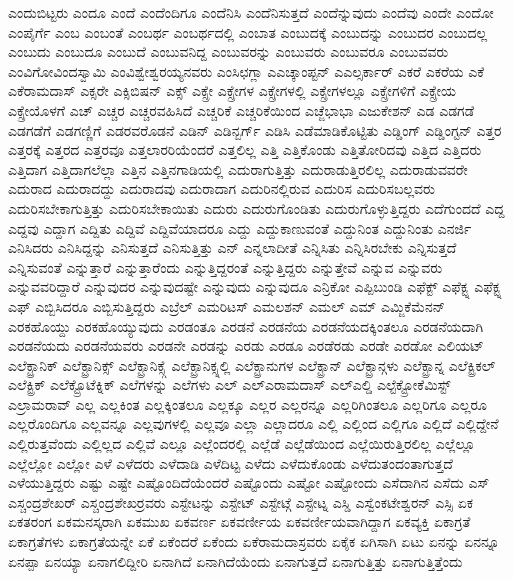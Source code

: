 {ಎಂದುಬಿಟ್ಟರು
ಎಂದೂ
ಎಂದೆ
ಎಂದೆಂದಿಗೂ
ಎಂದೆನಿಸಿ
ಎಂದೆನಿಸುತ್ತದೆ
ಎಂದೆನ್ನುವುದು
ಎಂದೆವು
ಎಂದೇ
ಎಂದೋ
ಎಂಪೈರ್ಗೆ
ಎಂಬ
ಎಂಬಂತೆ
ಎಂಬರ್ಥ
ಎಂಬರ್ಥದಲ್ಲಿ
ಎಂಬಾತ
ಎಂಬುದಕ್ಕೆ
ಎಂಬುದನ್ನು
ಎಂಬುದರ
ಎಂಬುದಲ್ಲ
ಎಂಬುದು
ಎಂಬುದೂ
ಎಂಬುದೆ
ಎಂಬುವನಿದ್ದ
ಎಂಬುವರನ್ನು
ಎಂಬುವರು
ಎಂಬುವರೂ
ಎಂಬುವವರು
ಎಂವಿಗೋವಿಂದಸ್ವಾಮಿ
ಎಂವಿಶ್ವೇಶ್ವರಯ್ಯನವರು
ಎಂಸಿಛಗ್ಲಾ
ಎಎಚ್ಕಾಂಪ್ಟನ್
ಎಎಲ್ಸರ್ಕಾರ್
ಎಕರೆ
ಎಕರೆಯ
ಎಕೆ
ಎಕೆರಾಮದಾಸ್
ಎಕ್ಸರೇ
ಎಕ್ಸಿಬಿಷನ್
ಎಕ್ಸ್
ಎಕ್ಸ್ರೇ
ಎಕ್ಸ್ರೇಗಳ
ಎಕ್ಸ್ರೇಗಳಲ್ಲಿ
ಎಕ್ಸ್ರೇಗಳಲ್ಲೂ
ಎಕ್ಸ್ರೇಗಳಿಗೆ
ಎಕ್ಸ್ರೇಯ
ಎಕ್ಸ್ರೇಯೊಳಗೆ
ಎಚ್
ಎಚ್ಚರ
ಎಚ್ಚರವಹಿಸಿದೆ
ಎಚ್ಚರಿಕೆ
ಎಚ್ಚರಿಕೆಯಿಂದ
ಎಚ್ಜೆಭಾಭಾ
ಎಜುಕೇಶನ್
ಎಡ
ಎಡಗಡೆ
ಎಡಗಡೆಗೆ
ಎಡಗಣ್ಣಿಗೆ
ಎಡರವರೊಡನೆ
ಎಡಿನ್
ಎಡಿನ್ಬರ್ಗ್
ಎಡಿಸಿ
ಎಡೆಮಾಡಿಕೊಟ್ಟಿತು
ಎಡ್ಡಿಂಗ್
ಎಡ್ಡಿಂಗ್ಟನ್
ಎತ್ತರ
ಎತ್ತರಕ್ಕೆ
ಎತ್ತರದ
ಎತ್ತರವೂ
ಎತ್ತಲಾರರಿಯೆಂದರೆ
ಎತ್ತಲಿಲ್ಲ
ಎತ್ತಿ
ಎತ್ತಿಕೊಂಡು
ಎತ್ತಿತೋರಿದವು
ಎತ್ತಿದ
ಎತ್ತಿದರು
ಎತ್ತಿದಾಗ
ಎತ್ತಿದಾಗಲೆಲ್ಲಾ
ಎತ್ತಿನ
ಎತ್ತಿನಗಾಡಿಯಲ್ಲಿ
ಎದುರಾಗುತ್ತಿತ್ತು
ಎದುರಾಡುತ್ತಿರಲಿಲ್ಲ
ಎದುರಾಡುವವರೇ
ಎದುರಾದ
ಎದುರಾದದ್ದು
ಎದುರಾದವು
ಎದುರಾದಾಗ
ಎದುರಿನಲ್ಲಿರುವ
ಎದುರಿಸ
ಎದುರಿಸಬಲ್ಲವರು
ಎದುರಿಸಬೇಕಾಗುತ್ತಿತ್ತು
ಎದುರಿಸಬೇಕಾಯಿತು
ಎದುರು
ಎದುರುಗೊಂಡಿತು
ಎದುರುಗೊಳ್ಳುತ್ತಿದ್ದರು
ಎದೆಗುಂದದೆ
ಎದ್ದ
ಎದ್ದವು
ಎದ್ದಾಗ
ಎದ್ದಿತು
ಎದ್ದಿವೆ
ಎದ್ದಿವೆಯಾದರೂ
ಎದ್ದು
ಎದ್ದುಕಾಣುವಂತೆ
ಎದ್ದುನಿಂತ
ಎದ್ದುನಿಂತು
ಎನರ್ಜಿ
ಎನಿಸಿದರು
ಎನಿಸಿದ್ದನ್ನು
ಎನಿಸುತ್ತದೆ
ಎನಿಸುತ್ತಿತ್ತು
ಎನ್
ಎನ್ನಲಾದೀತೆ
ಎನ್ನಿಸಿತು
ಎನ್ನಿಸಿರಬೇಕು
ಎನ್ನಿಸುತ್ತದೆ
ಎನ್ನಿಸುವಂತೆ
ಎನ್ನುತ್ತಾರೆ
ಎನ್ನುತ್ತಾರೆಂದು
ಎನ್ನುತ್ತಿದ್ದರಂತೆ
ಎನ್ನುತ್ತಿದ್ದರು
ಎನ್ನುತ್ತೇವೆ
ಎನ್ನುವ
ಎನ್ನುವರು
ಎನ್ನುವವರಿದ್ದಾರೆ
ಎನ್ನುವುದರ
ಎನ್ನುವುದಷ್ಟೇ
ಎನ್ನುವುದು
ಎನ್ನುವುದೂ
ಎನ್ರಿಕೋ
ಎಪ್ಪಿಬುಂಡಿ
ಎಫೆಕ್ಟ್
ಎಫೆಕ್ಟ್ನ
ಎಫೆಕ್ಟ್ನ
ಎಫ್
ಎಬ್ಬಿಸಿದರೂ
ಎಬ್ಬಿಸುತ್ತಿದ್ದರು
ಎಬ್ರೆಲ್
ಎಮರಿಟಸ್
ಎಮಲಶನ್
ಎಮಲ್
ಎಮ್
ಎಮ್ಜಿಕೆಮೆನನ್
ಎರಕಹೊಯ್ದು
ಎರಕಹೊಯ್ಯುವುದು
ಎರಡಂತೂ
ಎರಡನೆ
ಎರಡನೆಯ
ಎರಡನೆಯದಕ್ಕಿಂತಲೂ
ಎರಡನೆಯದಾಗಿ
ಎರಡನೆಯದು
ಎರಡನೆಯವರು
ಎರಡನೇ
ಎರಡನ್ನು
ಎರಡು
ಎರಡೂ
ಎರಡೆರಡು
ಎರಡೇ
ಎರಡೋ
ಎಲಿಯಟ್
ಎಲೆಕ್ಟ್ರಾನಿಕ್
ಎಲೆಕ್ಟ್ರಾನಿಕ್ಸ್
ಎಲೆಕ್ಟ್ರಾನಿಕ್ಸ್ಗೆ
ಎಲೆಕ್ಟ್ರಾನಿಕ್ಸ್ನಲ್ಲಿ
ಎಲೆಕ್ಟ್ರಾನುಗಳ
ಎಲೆಕ್ಟ್ರಾನ್
ಎಲೆಕ್ಟ್ರಾನ್ಗಳು
ಎಲೆಕ್ಟ್ರಾನ್ನ
ಎಲೆಕ್ಟ್ರಿಕಲ್
ಎಲೆಕ್ಟ್ರಿಕ್
ಎಲೆಕ್ಟ್ರೊಟೆಕ್ನಿಕ್
ಎಲೆಗಳನ್ನು
ಎಲೆಗಳು
ಎಲ್
ಎಲ್ಎರಾಮದಾಸ್
ಎಲ್ಎಲ್ಡಿ
ಎಲ್ಟೆಕ್ಟ್ರೋಕೆಮಿಸ್ಟ್
ಎಲ್ರಾಮರಾವ್
ಎಲ್ಲ
ಎಲ್ಲಕಿಂತ
ಎಲ್ಲಕ್ಕಿಂತಲೂ
ಎಲ್ಲಕ್ಕೂ
ಎಲ್ಲರ
ಎಲ್ಲರನ್ನೂ
ಎಲ್ಲರಿಗಿಂತಲೂ
ಎಲ್ಲರಿಗೂ
ಎಲ್ಲರೂ
ಎಲ್ಲರೊಂದಿಗೂ
ಎಲ್ಲವನ್ನೂ
ಎಲ್ಲವುಗಳಲ್ಲಿ
ಎಲ್ಲವೂ
ಎಲ್ಲಾ
ಎಲ್ಲಾದರೂ
ಎಲ್ಲಿ
ಎಲ್ಲಿಂದ
ಎಲ್ಲಿಗೂ
ಎಲ್ಲಿದೆ
ಎಲ್ಲಿದ್ದೇನೆ
ಎಲ್ಲಿರುತ್ತವೆಂದು
ಎಲ್ಲಿಲ್ಲದ
ಎಲ್ಲಿವೆ
ಎಲ್ಲೂ
ಎಲ್ಲೆಂದರಲ್ಲಿ
ಎಲ್ಲೆಡೆ
ಎಲ್ಲೆಡೆಯಿಂದ
ಎಲ್ಲೆಯಿರುತ್ತಿರಲಿಲ್ಲ
ಎಲ್ಲೆಲ್ಲೂ
ಎಲ್ಲೆಲ್ಲೋ
ಎಲ್ಲೋ
ಎಳೆ
ಎಳೆದರು
ಎಳೆದಾಡಿ
ಎಳೆದಿಟ್ಟ
ಎಳೆದು
ಎಳೆದುಕೊಂಡು
ಎಳೆದುತಂದಂತಾಗುತ್ತದೆ
ಎಳೆಯುತ್ತಿದ್ದರು
ಎಷ್ಟು
ಎಷ್ಟೇ
ಎಷ್ಟೊಂದಿದೆಯೆಂದರೆ
ಎಷ್ಟೊಂದು
ಎಷ್ಟೋ
ಎಷ್ಟೋಂದು
ಎಸೆದಾಗಿನ
ಎಸೆದು
ಎಸ್
ಎಸ್ಚಂದ್ರಶೇಖರ್
ಎಸ್ಚಂದ್ರಶೇಖರ್ರವರು
ಎಸ್ಟೇಟನ್ನು
ಎಸ್ಟೇಟ್
ಎಸ್ಟೇಟ್ಗೆ
ಎಸ್ಟೇಟ್ನ
ಎಸ್ಡಿ
ಎಸ್ವೆಂಕಟೇಶ್ವರನ್
ಎಸ್ಸಿ
ಏಕ
ಏಕತರಂಗ
ಏಕಮನಸ್ಕರಾಗಿ
ಏಕಮುಖ
ಏಕವರ್ಣ
ಏಕವರ್ಣೀಯ
ಏಕವರ್ಣೀಯವಾಗಿದ್ದಾಗ
ಏಕವ್ಯಕ್ತಿ
ಏಕಾಗ್ರತೆ
ಏಕಾಗ್ರತೆಗಳು
ಏಕಾಗ್ರತೆಯನ್ನೇ
ಏಕೆ
ಏಕೆಂದರೆ
ಏಕೆಂದು
ಏಕೆರಾಮದಾಸ್ರವರು
ಏಕೈಕ
ಏಗಿಸಾಗಿ
ಏಟು
ಏನನ್ನು
ಏನನ್ನೂ
ಏನಪ್ಪಾ
ಏನಯ್ಯಾ
ಏನಾಗಲಿದ್ದೀರಿ
ಏನಾಗಿದೆ
ಏನಾಗಿದೆಯೆಂದು
ಏನಾಗುತ್ತದೆ
ಏನಾಗುತ್ತಿತ್ತು
ಏನಾಗುತ್ತಿತ್ತೆಂದು
}
